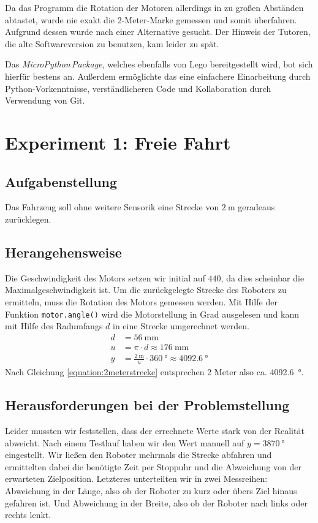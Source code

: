 \documentclass[ngerman]{tudscrreprt}
\newcommand{\code}[1]{\texttt{#1}}
\begin{document}
Da das Programm die Rotation der Motoren allerdings in zu großen Abständen abtastet, wurde nie exakt die 2-Meter-Marke gemessen und somit überfahren. Aufgrund dessen wurde nach einer Alternative gesucht. Der Hinweis der Tutoren, die alte Softwareversion zu benutzen, kam leider zu spät.

Das \emph{MicroPython\,Package}, welches ebenfalls von Lego bereitgestellt wird, bot sich hierfür bestens an. Außerdem ermöglichte das eine einfachere Einarbeitung durch Python-Vorkenntnisse, verständlicheren Code und Kollaboration durch Verwendung von Git.


\section{Experiment 1: Freie Fahrt}
\subsection{Aufgabenstellung}
Das Fahrzeug soll ohne weitere Sensorik eine Strecke von $\SI{2}{\m}$ geradeaus zurücklegen.

\subsection{Herangehensweise}
Die Geschwindigkeit des Motors setzen wir initial auf $440$, da dies scheinbar die Maximalgeschwindigkeit ist. Um die zurückgelegte Strecke des Roboters zu ermitteln, muss die Rotation des Motors gemessen werden. Mit Hilfe der Funktion \code{motor.angle()} wird die Motorstellung in Grad ausgelesen und kann mit Hilfe des Radumfangs $d$ in eine Strecke umgerechnet werden.
%
\begin{equation}
    \label{equation:2meterstrecke}
    \begin{aligned}
       d &= \SI{56}{\mm}\\
       u &= \pi \cdot d \approx \SI{176}{\mm} \\
       y &= \frac{\SI{2}{\m}}{u} \cdot \SI{360}{\degree} \approx \SI{4092.6}{\degree}
    \end{aligned}
 \end{equation}
Nach Gleichung \ref{equation:2meterstrecke} entsprechen 2 Meter also ca. \SI{4092.6}{\degree}.

\subsection{Herausforderungen bei der Problemstellung}
Leider mussten wir feststellen, dass der errechnete Werte stark von der Realität abweicht. Nach einem Testlauf haben wir den Wert manuell auf $y = \SI{3870}{\degree}$ eingestellt. Wir ließen den Roboter mehrmals die Strecke abfahren und ermittelten dabei die benötigte Zeit per Stoppuhr und die Abweichung von der erwarteten Zielposition. Letzteres unterteilten wir in zwei Messreihen: Abweichung in der Länge, also ob der Roboter zu kurz oder übers Ziel hinaus gefahren ist. Und Abweichung in der Breite, also ob der Roboter nach links oder rechts lenkt.
\end{document}

